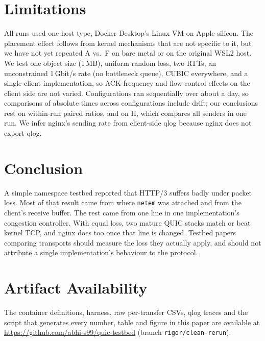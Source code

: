 \documentclass[conference]{IEEEtran}
\newcommand{\hthree}{HTTP/3}
\begin{document}
\section{Limitations}\label{sec:limits}
All runs used one host type, Docker Desktop's Linux VM on Apple silicon. The placement effect follows from kernel
mechanisms that are not specific to it, but we have not yet repeated A vs.\ F on bare metal or on the original WSL2 host. We
test one object size (1\,MB), uniform random loss, two RTTs, an unconstrained 1\,Gbit/s rate (no bottleneck queue), CUBIC
everywhere, and a single client implementation, so ACK-frequency and flow-control effects on the client side are not
varied. Configurations ran sequentially over about a day, so comparisons of absolute times across configurations include
drift; our conclusions rest on within-run paired ratios, and on H, which compares all senders in one run. We infer nginx's
sending rate from client-side qlog because nginx does not export qlog.

\section{Conclusion}
A simple namespace testbed reported that \hthree{} suffers badly under packet loss. Most of that result came from where
\texttt{netem} was attached and from the client's receive buffer. The rest came from one line in one implementation's
congestion controller. With equal loss, two mature QUIC stacks match or beat kernel TCP, and nginx does too once that line
is changed. Testbed papers comparing transports should measure the loss they actually apply, and should not attribute a
single implementation's behaviour to the protocol.

\section*{Artifact Availability}
The container definitions, harness, raw per-transfer CSVs, qlog traces and the script that generates every number, table
and figure in this paper are available at \url{https://github.com/abhi-s99/quic-testbed} (branch \texttt{rigor/clean-rerun}).



\end{document}
